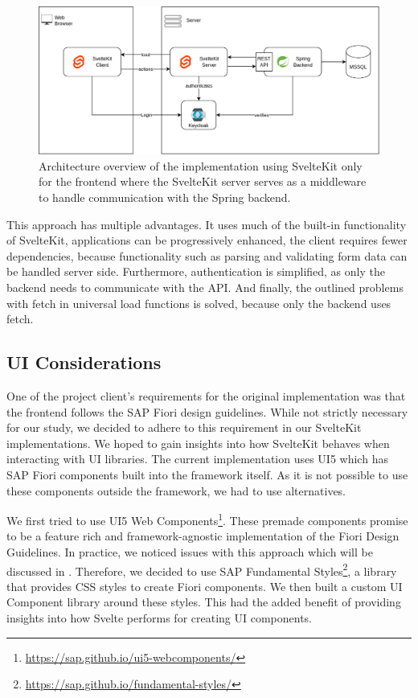 \begin{figure}[ht]
    \centering
    \includegraphics[width=.9\linewidth]{assets/dswfd-architecture-frontend}
    \caption{Architecture overview of the implementation using SvelteKit only for the frontend where the SvelteKit server serves as a middleware to handle communication with the Spring backend.}
    \label{fig:dswfd-architecture-frontend}
\end{figure}

This approach has multiple advantages. It uses much of the built-in functionality of SvelteKit, applications can be progressively enhanced, the client requires fewer dependencies, because functionality such as parsing and validating form data can be handled server side. Furthermore, authentication is simplified, as only the backend needs to communicate with the API. And finally, the outlined problems with fetch in universal load functions is solved, because only the backend uses fetch.


\subsection{UI Considerations}
\label{sec:implementation-ui}
One of the project client's requirements for the original implementation was that the frontend follows the SAP Fiori design guidelines. While not strictly necessary for our study, we decided to adhere to this requirement in our SvelteKit implementations. We hoped to gain insights into how SvelteKit behaves when interacting with UI libraries. The current implementation uses UI5 which has SAP Fiori components built into the framework itself. As it is not possible to use these components outside the framework, we had to use alternatives.   

We first tried to use UI5 Web Components\footnote{\url{https://sap.github.io/ui5-webcomponents/}}. These premade components promise to be a feature rich and framework-agnostic implementation of the Fiori Design Guidelines. In practice, we noticed issues with this approach which will be discussed in . Therefore, we decided to use SAP Fundamental Styles\footnote{\url{https://sap.github.io/fundamental-styles/}}, a library that provides CSS styles to create Fiori components. We then built a custom UI Component library around these styles. This had the added benefit of providing insights into how Svelte performs for creating UI components.


